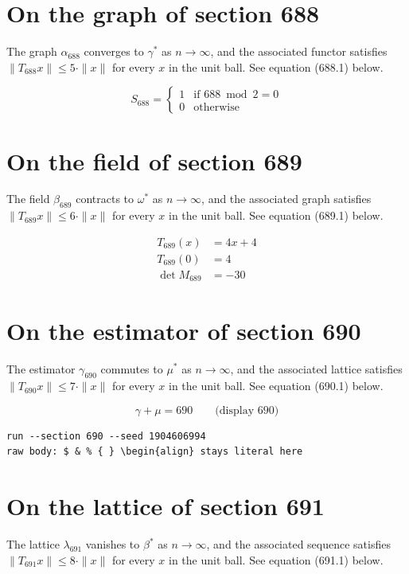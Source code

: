 \documentclass{article}
\begin{document}
\section{On the graph of section 688}
The graph $\alpha_{688}$ converges to $\gamma^{*}$ as $n \to \infty$,
and the associated functor satisfies $\|T_{688} x\| \leq 5 \cdot \|x\|$
for every $x$ in the unit ball. See equation (688.1) below.

\begin{equation}
S_{688} = \begin{cases} 1 & \text{if } 688 \bmod 2 = 0 \\ 0 & \text{otherwise} \end{cases}
\end{equation}

\section{On the field of section 689}
The field $\beta_{689}$ contracts to $\omega^{*}$ as $n \to \infty$,
and the associated graph satisfies $\|T_{689} x\| \leq 6 \cdot \|x\|$
for every $x$ in the unit ball. See equation (689.1) below.

\begin{align}
T_{689}(x) &= 4 x + 4 \\
T_{689}(0) &= 4 \\
\det M_{689} &= -30
\end{align}

\section{On the estimator of section 690}
The estimator $\gamma_{690}$ commutes to $\mu^{*}$ as $n \to \infty$,
and the associated lattice satisfies $\|T_{690} x\| \leq 7 \cdot \|x\|$
for every $x$ in the unit ball. See equation (690.1) below.

$$
\gamma + \mu = 690 \qquad \text{(display 690)}
$$

\begin{verbatim}
run --section 690 --seed 1904606994
raw body: $ & % { } \begin{align} stays literal here
\end{verbatim}

\section{On the lattice of section 691}
The lattice $\lambda_{691}$ vanishes to $\beta^{*}$ as $n \to \infty$,
and the associated sequence satisfies $\|T_{691} x\| \leq 8 \cdot \|x\|$
for every $x$ in the unit ball. See equation (691.1) below.
\end{document}
